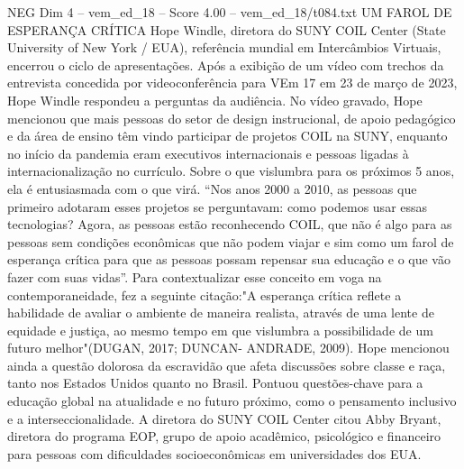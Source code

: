 \begin{textsample}{NEG Dim 4 – vem\_ed\_18 – Score 4.00 – vem\_ed\_18/t084.txt}  \label{ex:f4_neg_123}
UM FAROL DE ESPERANÇA CRÍTICA Hope Windle, diretora do SUNY COIL Center (State University of New York / EUA), referência mundial em Intercâmbios Virtuais, encerrou o ciclo de apresentações.
Após a exibição de um vídeo com trechos da entrevista concedida por videoconferência para VEm 17 em 23 de março de 2023, Hope Windle respondeu a perguntas da audiência.
No vídeo gravado, Hope mencionou que mais pessoas do setor de design instrucional, de apoio pedagógico e da área de ensino têm vindo participar de projetos COIL na SUNY, enquanto no início da pandemia eram executivos internacionais e pessoas ligadas à internacionalização no currículo.
Sobre o que vislumbra para os próximos 5 anos, ela é entusiasmada com o que virá. “Nos anos 2000 a 2010, as pessoas que primeiro adotaram esses projetos se perguntavam: como podemos usar essas tecnologias?
Agora, as pessoas estão reconhecendo COIL, que não é algo para as pessoas sem condições econômicas que não podem viajar e sim como um farol de esperança crítica para que as pessoas possam repensar sua educação e o que vão fazer com suas vidas”.
Para contextualizar esse conceito em voga na contemporaneidade, fez a seguinte citação:"A esperança crítica reflete a habilidade de avaliar o ambiente de maneira realista, através de uma lente de equidade e justiça, ao mesmo tempo em que vislumbra a possibilidade de um futuro melhor"(DUGAN, 2017; DUNCAN- ANDRADE, 2009).
Hope mencionou ainda a questão dolorosa da escravidão que afeta discussões sobre classe e raça, tanto nos Estados Unidos quanto no Brasil.
Pontuou questões-chave para a educação global na atualidade e no futuro próximo, como o pensamento inclusivo e a interseccionalidade.
A diretora do SUNY COIL Center citou Abby Bryant, diretora do programa EOP, grupo de apoio acadêmico, psicológico e financeiro para pessoas com dificuldades socioeconômicas em universidades dos EUA.

\end{textsample}
